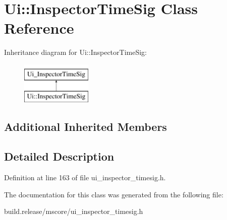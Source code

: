 \hypertarget{class_ui_1_1_inspector_time_sig}{}\section{Ui\+:\+:Inspector\+Time\+Sig Class Reference}
\label{class_ui_1_1_inspector_time_sig}
Inheritance diagram for Ui\+:\+:Inspector\+Time\+Sig\+:\begin{figure}[H]
\begin{center}
\leavevmode
\includegraphics[height=2.000000cm]{class_ui_1_1_inspector_time_sig}
\end{center}
\end{figure}
\subsection*{Additional Inherited Members}


\subsection{Detailed Description}


Definition at line 163 of file ui\+\_\+inspector\+\_\+timesig.\+h.



The documentation for this class was generated from the following file\+:\begin{DoxyCompactItemize}
\item 
build.\+release/mscore/ui\+\_\+inspector\+\_\+timesig.\+h\end{DoxyCompactItemize}
